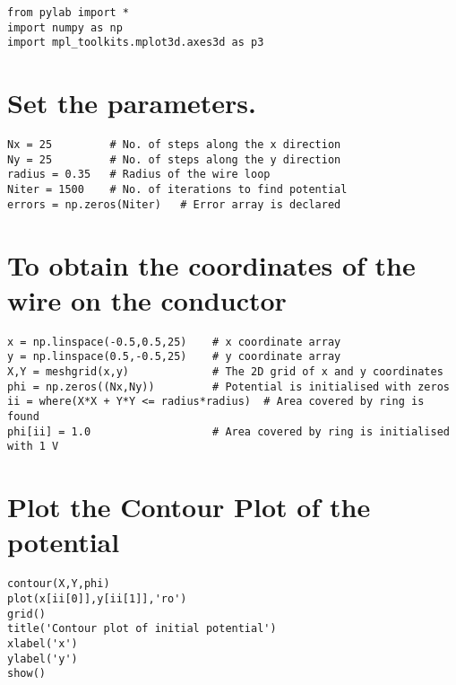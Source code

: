 \documentclass[11pt]{article}
\begin{document}
    \begin{Verbatim}
from pylab import *
import numpy as np
import mpl_toolkits.mplot3d.axes3d as p3
\end{Verbatim}

    \hypertarget{set-the-parameters.}{%
\section{Set the parameters.}\label{set-the-parameters.}}

    \begin{Verbatim}
Nx = 25         # No. of steps along the x direction
Ny = 25         # No. of steps along the y direction
radius = 0.35   # Radius of the wire loop
Niter = 1500    # No. of iterations to find potential
errors = np.zeros(Niter)   # Error array is declared
\end{Verbatim}


    \hypertarget{to-obtain-the-coordinates-of-the-wire-on-the-conductor}{%
\section{To obtain the coordinates of the wire on the
conductor}\label{to-obtain-the-coordinates-of-the-wire-on-the-conductor}}

    \begin{Verbatim}
x = np.linspace(-0.5,0.5,25)    # x coordinate array
y = np.linspace(0.5,-0.5,25)    # y coordinate array
X,Y = meshgrid(x,y)             # The 2D grid of x and y coordinates
phi = np.zeros((Nx,Ny))         # Potential is initialised with zeros
ii = where(X*X + Y*Y <= radius*radius)  # Area covered by ring is found
phi[ii] = 1.0                   # Area covered by ring is initialised with 1 V
\end{Verbatim}


    \hypertarget{plot-the-contour-plot-of-the-potential}{%
\section{Plot the Contour Plot of the
potential}\label{plot-the-contour-plot-of-the-potential}}

    \begin{Verbatim}
contour(X,Y,phi)
plot(x[ii[0]],y[ii[1]],'ro')
grid()
title('Contour plot of initial potential')
xlabel('x')
ylabel('y')
show()


\end{Verbatim}


    \begin{center}
    \end{center}
    { \hspace*{\fill} \\}
    
\end{document}
